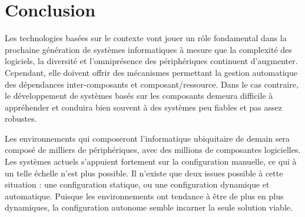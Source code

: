 \section{Conclusion}

Les technologies basées sur le contexte vont jouer un rôle fondamental dans la
prochaine génération de systèmes informatiques à mesure que la complexité des
logiciels, la diversité et l'omniprésence des périphériques continuent
d'augmenter. Cependant, elle doivent offrir des mécanismes permettant la
gestion automatique des dépendances inter-composants et composant/ressource.
Dans le cas contraire, le développement de systèmes basés sur les composants
demeura difficile à appréhender et conduira bien souvent à des systèmes peu
fiables et pas assez robustes.

Les environnements qui composeront l'informatique ubiquitaire de demain sera
composé de milliers de périphériques, avec des millions de composantes
logicielles. Les systèmes actuels s'appuient fortement sur la configuration
manuelle, ce qui à un telle échelle n'est plus possible. Il n'existe que deux
issues possible à cette situation : une configuration statique, ou une
configuration dynamique et automatique. Puisque les environnements ont
tendance à être de plus en plus dynamiques, la configuration autonome semble
incarner la seule solution viable.


